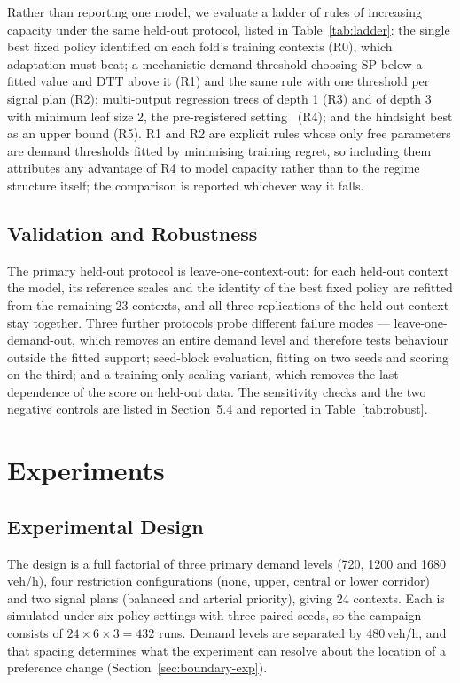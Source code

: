 \documentclass[runningheads]{llncs}
\begin{document}
Rather than reporting one model, we evaluate a ladder of rules of increasing capacity
under the same held-out protocol, listed in Table~\ref{tab:ladder}: the single best fixed
policy identified on each fold's training contexts (R0), which adaptation must beat; a
mechanistic demand threshold choosing SP below a fitted value and DTT above it (R1) and
the same rule with one threshold per signal plan (R2); multi-output regression trees of
depth 1 (R3) and of depth 3 with minimum leaf size 2, the pre-registered
setting~\cite{breiman2017cart} (R4); and the hindsight best as an upper bound (R5). R1 and
R2 are explicit rules whose only free parameters are demand thresholds fitted by
minimising training regret, so including them attributes any advantage of R4 to model
capacity rather than to the regime structure itself; the comparison is reported whichever
way it falls.

\subsection{Validation and Robustness}
\label{sec:validation}

The primary held-out protocol is leave-one-context-out: for each held-out context the
model, its reference scales and the identity of the best fixed policy are refitted from
the remaining 23 contexts, and all three replications of the held-out context stay
together. Three further protocols probe different failure modes --- leave-one-demand-out,
which removes an entire demand level and therefore tests behaviour outside the fitted
support; seed-block evaluation, fitting on two seeds and scoring on the third; and a
training-only scaling variant, which removes the last dependence of the score on held-out
data. The sensitivity checks and the two negative controls are listed in Section~5.4 and
reported in Table~\ref{tab:robust}.

\section{Experiments}

\subsection{Experimental Design}

The design is a full factorial of three primary demand levels (720, 1200 and
1680\,veh/h), four restriction configurations (none, upper, central or lower corridor)
and two signal plans (balanced and arterial priority), giving 24 contexts. Each is
simulated under six policy settings with three paired seeds, so the campaign consists of
$24\times6\times3=432$ runs. Demand levels are separated by 480\,veh/h, and that spacing
determines what the experiment can resolve about the location of a preference change
(Section~\ref{sec:boundary-exp}).
\end{document}
